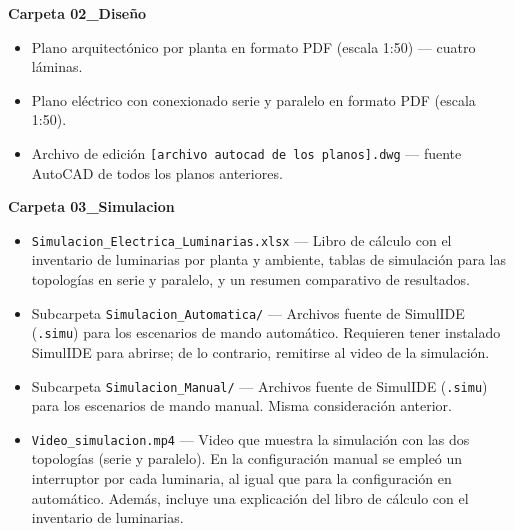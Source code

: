 \medskip
\noindent\textbf{Carpeta 02\_Diseño}
\begin{itemize}
  \item Plano arquitectónico por planta en formato PDF (escala 1:50) — cuatro láminas.
  \item Plano eléctrico con conexionado serie y paralelo en formato PDF (escala 1:50).
  \item Archivo de edición \texttt{[archivo autocad de los planos].dwg} — fuente AutoCAD de todos los planos anteriores.
\end{itemize}

\medskip
\noindent\textbf{Carpeta 03\_Simulacion}
\begin{itemize}
  \item \texttt{Simulacion\_Electrica\_Luminarias.xlsx} — Libro de cálculo con el inventario de luminarias por planta y ambiente, tablas de simulación para las topologías en serie y paralelo, y un resumen comparativo de resultados.
  \item Subcarpeta \texttt{Simulacion\_Automatica/} — Archivos fuente de SimulIDE (\texttt{.simu}) para los escenarios de mando automático. Requieren tener instalado SimulIDE para abrirse; de lo contrario, remitirse al video de la simulación.
  \item Subcarpeta \texttt{Simulacion\_Manual/} — Archivos fuente de SimulIDE (\texttt{.simu}) para los escenarios de mando manual. Misma consideración anterior.
  \item \texttt{Video\_simulacion.mp4} — Video que muestra la simulación con las dos topologías (serie y paralelo). En la configuración manual se empleó un interruptor por cada luminaria, al igual que para la configuración en automático. Además, incluye una explicación del libro de cálculo con el inventario de luminarias.
\end{itemize}